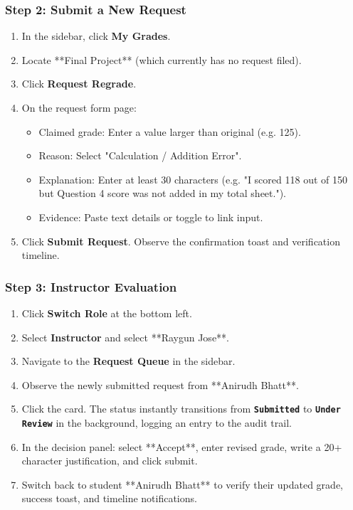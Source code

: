 \documentclass{article}
\begin{document}
\subsubsection{Step 2: Submit a New Request}
\begin{enumerate}
    \item In the sidebar, click \textbf{My Grades}.
    \item Locate **Final Project** (which currently has no request filed).
    \item Click \textbf{Request Regrade}.
    \item On the request form page:
    \begin{itemize}
        \item Claimed grade: Enter a value larger than original (e.g. 125).
        \item Reason: Select "Calculation / Addition Error".
        \item Explanation: Enter at least 30 characters (e.g. "I scored 118 out of 150 but Question 4 score was not added in my total sheet.").
        \item Evidence: Paste text details or toggle to link input.
    \end{itemize}
    \item Click \textbf{Submit Request}. Observe the confirmation toast and verification timeline.
\end{enumerate}

\subsubsection{Step 3: Instructor Evaluation}
\begin{enumerate}
    \item Click \textbf{Switch Role} at the bottom left.
    \item Select \textbf{Instructor} and select **Raygun Jose**.
    \item Navigate to the \textbf{Request Queue} in the sidebar.
    \item Observe the newly submitted request from **Anirudh Bhatt**.
    \item Click the card. The status instantly transitions from \textbf{\texttt{Submitted}} to \textbf{\texttt{Under Review}} in the background, logging an entry to the audit trail.
    \item In the decision panel: select **Accept**, enter revised grade, write a 20+ character justification, and click submit.
    \item Switch back to student **Anirudh Bhatt** to verify their updated grade, success toast, and timeline notifications.
\end{enumerate}
\end{document}
